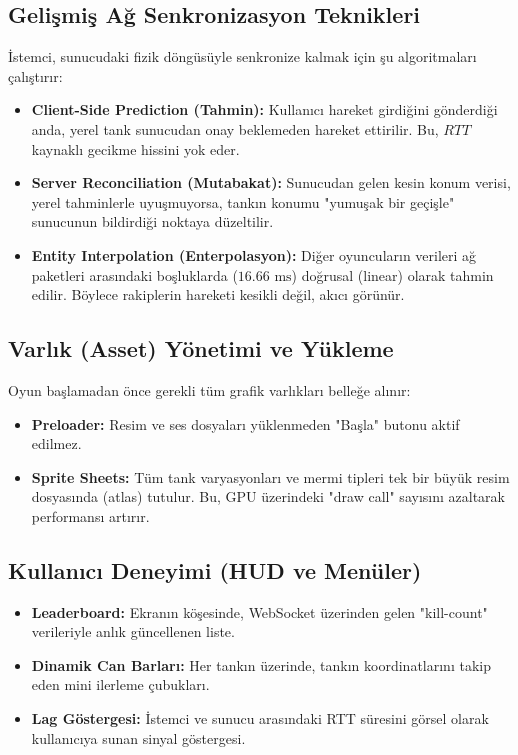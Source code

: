 \documentclass[12pt,a4paper]{article}
\begin{document}
\subsection{Gelişmiş Ağ Senkronizasyon Teknikleri}
İstemci, sunucudaki fizik döngüsüyle senkronize kalmak için şu algoritmaları çalıştırır:
\begin{itemize}
      \item \textbf{Client-Side Prediction (Tahmin):} Kullanıcı hareket girdiğini gönderdiği anda, yerel tank sunucudan onay beklemeden hareket ettirilir. Bu, $RTT$ kaynaklı gecikme hissini yok eder.
      \item \textbf{Server Reconciliation (Mutabakat):} Sunucudan gelen kesin konum verisi, yerel tahminlerle uyuşmuyorsa, tankın konumu "yumuşak bir geçişle" sunucunun bildirdiği noktaya düzeltilir.
      \item \textbf{Entity Interpolation (Enterpolasyon):} Diğer oyuncuların verileri ağ paketleri arasındaki boşluklarda ($16.66 \text{ ms}$) doğrusal (linear) olarak tahmin edilir. Böylece rakiplerin hareketi kesikli değil, akıcı görünür.
\end{itemize}

\subsection{Varlık (Asset) Yönetimi ve Yükleme}
Oyun başlamadan önce gerekli tüm grafik varlıkları belleğe alınır:
\begin{itemize}
      \item \textbf{Preloader:} Resim ve ses dosyaları yüklenmeden "Başla" butonu aktif edilmez.
      \item \textbf{Sprite Sheets:} Tüm tank varyasyonları ve mermi tipleri tek bir büyük resim dosyasında (atlas) tutulur. Bu, GPU üzerindeki "draw call" sayısını azaltarak performansı artırır.
\end{itemize}

\subsection{Kullanıcı Deneyimi (HUD ve Menüler)}
\begin{itemize}
      \item \textbf{Leaderboard:} Ekranın köşesinde, WebSocket üzerinden gelen "kill-count" verileriyle anlık güncellenen liste.
      \item \textbf{Dinamik Can Barları:} Her tankın üzerinde, tankın koordinatlarını takip eden mini ilerleme çubukları.
      \item \textbf{Lag Göstergesi:} İstemci ve sunucu arasındaki RTT süresini görsel olarak kullanıcıya sunan sinyal göstergesi.
\end{itemize}
\end{document}
